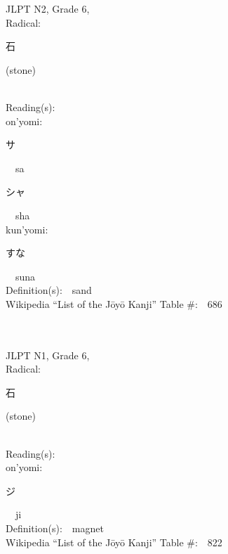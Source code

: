 \begin{multicols}{2}
{JLPT N2, Grade 6, \\Radical:\ \ {\begin{CJK}{UTF8}{min} 石 \end{CJK}} (stone) } \\
Reading(s):\ \ \\
{\hspace*{1em}}on'yomi:\ \ \\
{\hspace*{2em}}{\begin{CJK}{UTF8}{min} サ \end{CJK}}\ \ sa\ \ \\
{\hspace*{2em}}{\begin{CJK}{UTF8}{min} シャ \end{CJK}}\ \ sha\ \ \\
{\hspace*{1em}}kun'yomi:\ \ \\
{\hspace*{2em}}{\begin{CJK}{UTF8}{min} すな \end{CJK}}\ \ suna\ \ \\
Definition(s):\ \ sand \\
Wikipedia ``List of the J\=oy\=o Kanji'' Table \#:\ \ 686 \\
\ \ \\
{\fontsize{34pt}{40pt}  }\ \ \\  %
{JLPT N1, Grade 6, \\Radical:\ \ {\begin{CJK}{UTF8}{min} 石 \end{CJK}} (stone) } \\
Reading(s):\ \ \\
{\hspace*{1em}}on'yomi:\ \ \\
{\hspace*{2em}}{\begin{CJK}{UTF8}{min} ジ \end{CJK}}\ \ ji\ \ \\
Definition(s):\ \ magnet \\
Wikipedia ``List of the J\=oy\=o Kanji'' Table \#:\ \ 822 \\
\ \ \\
{\fontsize{34pt}{40pt}  }\ \ \\  %

\end{multicols}
